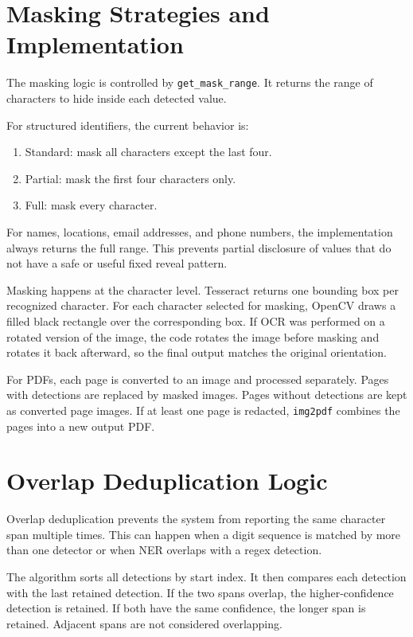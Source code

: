 \section{Masking Strategies and Implementation}

The masking logic is controlled by \texttt{get\_mask\_range}. It returns the range of characters to hide inside each detected value.

For structured identifiers, the current behavior is:

\begin{enumerate}
    \item Standard: mask all characters except the last four.
    \item Partial: mask the first four characters only.
    \item Full: mask every character.
\end{enumerate}

For names, locations, email addresses, and phone numbers, the implementation always returns the full range. This prevents partial disclosure of values that do not have a safe or useful fixed reveal pattern.

Masking happens at the character level. Tesseract returns one bounding box per recognized character. For each character selected for masking, OpenCV draws a filled black rectangle over the corresponding box. If OCR was performed on a rotated version of the image, the code rotates the image before masking and rotates it back afterward, so the final output matches the original orientation.

For PDFs, each page is converted to an image and processed separately. Pages with detections are replaced by masked images. Pages without detections are kept as converted page images. If at least one page is redacted, \texttt{img2pdf} combines the pages into a new output PDF.

\section{Overlap Deduplication Logic}

Overlap deduplication prevents the system from reporting the same character span multiple times. This can happen when a digit sequence is matched by more than one detector or when NER overlaps with a regex detection.

The algorithm sorts all detections by start index. It then compares each detection with the last retained detection. If the two spans overlap, the higher-confidence detection is retained. If both have the same confidence, the longer span is retained. Adjacent spans are not considered overlapping.

